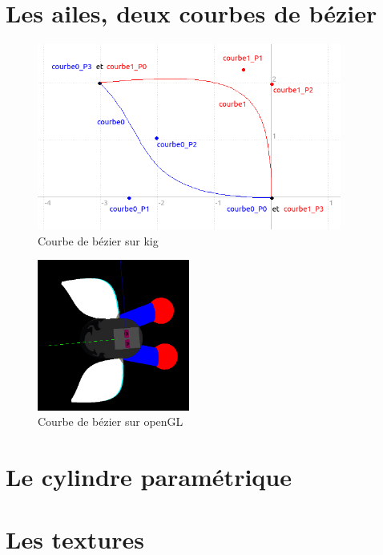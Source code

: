 \documentclass{article}
\begin{document}
\section{Les ailes, deux courbes de bézier}
\begin{figure}[htp]
    \centering
    \includegraphics[width=10cm]{./assets/kig_bezier.png}
    \caption{Courbe de bézier sur kig}
    \label{fig:classe}
\end{figure}

\begin{figure}[htp]
    \centering
    \includegraphics[width=5cm]{./assets/openGL_bezier.png}
    \caption{Courbe de bézier sur openGL}
    \label{fig:classe}
\end{figure}



\section{Le cylindre paramétrique}


\section{Les textures}

\end{document}
